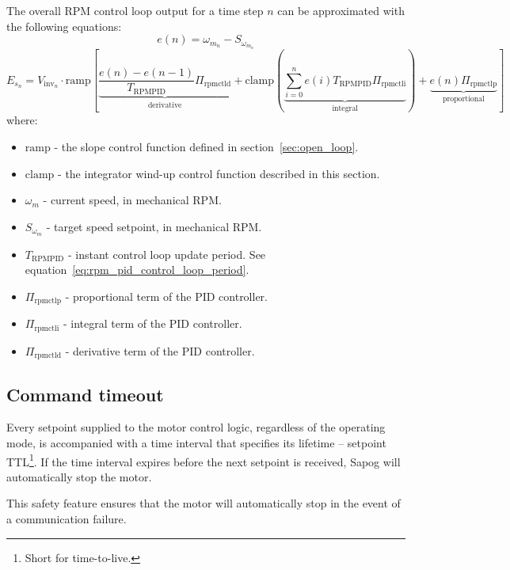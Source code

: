 \documentclass{zubaxdoc}
\begin{document}
The overall RPM control loop output for a time step $n$ can be approximated with the following equations:
\begin{equation}
e(n) = \omega_{m_{n}} - S_{\omega_{m_{n}}}
\end{equation}
\begin{equation}
E_{s_n} = V_{\text{inv}_n}\cdot\mathrm{ramp}
\left[
\underbrace{\frac{e\left(n\right) - e\left(n-1\right)}{T_{\text{RPMPID}}} \Pi_{\text{rpmctld}}}_\text{derivative} +
\mathrm{clamp}\left(
\underbrace{\sum_{i=0}^n e\left(i\right) T_{\text{RPMPID}} \Pi_{\text{rpmctli}}}_\text{integral}
\right) +
\underbrace{e\left(n\right) \Pi_{\text{rpmctlp}}}_\text{proportional}
\right]
\end{equation}
where:
\begin{itemize}
\item $\mathrm{ramp}$ - the slope control function defined in section~\ref{sec:open_loop}.
\item $\mathrm{clamp}$ - the integrator wind-up control function described in this section.
\item $\omega_{m}$ - current speed, in mechanical RPM.
\item $S_{\omega_{m}}$ - target speed setpoint, in mechanical RPM.
\item $T_{\text{RPMPID}}$ - instant control loop update period.
See equation~\ref{eq:rpm_pid_control_loop_period}.
\item $\Pi_{\text{rpmctlp}}$ - proportional term of the PID controller.
\item $\Pi_{\text{rpmctli}}$ - integral term of the PID controller.
\item $\Pi_{\text{rpmctld}}$ - derivative term of the PID controller.
\end{itemize}

\subsection{Command timeout}\label{sec:setpoint_ttl}

Every setpoint supplied to the motor control logic, regardless of the operating mode, is
accompanied with a time interval that specifies its lifetime -- setpoint TTL\footnote{Short for time-to-live.}.
If the time interval expires before the next setpoint is received, Sapog will automatically
stop the motor.

This safety feature ensures that the motor will automatically stop in the event of a communication failure.
\end{document}
